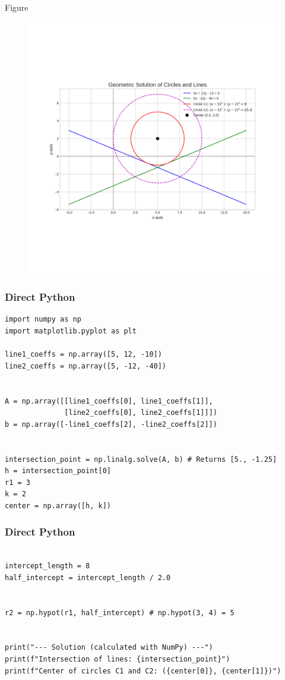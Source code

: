 \documentclass{beamer}
\begin{document}
\begin{frame}{Figure}
    \begin{figure}[H]
        \centering
        \includegraphics[width=0.8\columnwidth]{figs/figure.png}
        \caption{}
        \label{fig:placeholder}
    \end{figure}
\end{frame}
\begin{frame}[fragile]
\frametitle{Direct Python}
\begin{lstlisting}
import numpy as np
import matplotlib.pyplot as plt

line1_coeffs = np.array([5, 12, -10])
line2_coeffs = np.array([5, -12, -40])


A = np.array([[line1_coeffs[0], line1_coeffs[1]],
              [line2_coeffs[0], line2_coeffs[1]]])
b = np.array([-line1_coeffs[2], -line2_coeffs[2]])


intersection_point = np.linalg.solve(A, b) # Returns [5., -1.25]
h = intersection_point[0]
r1 = 3
k = 2
center = np.array([h, k])
\end{lstlisting}
\end{frame}
\begin{frame}[fragile]
\frametitle{Direct Python}
\begin{lstlisting}

intercept_length = 8
half_intercept = intercept_length / 2.0


r2 = np.hypot(r1, half_intercept) # np.hypot(3, 4) = 5


print("--- Solution (calculated with NumPy) ---")
print(f"Intersection of lines: {intersection_point}")
print(f"Center of circles C1 and C2: ({center[0]}, {center[1]})")
\end{lstlisting}
\end{frame}
\end{document}
